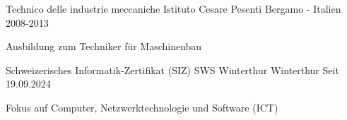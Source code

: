 

\begin{cventries}

   \cventry
    {Technico delle industrie meccaniche}
    {Istituto Cesare Pesenti}
    {Bergamo - Italien}
    {2008-2013}
    {
      \begin{cvitems} %
        \item {Ausbildung zum Techniker für Maschinenbau}
      \end{cvitems}
    }
    
   \cventry
    {Schweizerisches Informatik-Zertifikat (SIZ)}
    {SWS Winterthur}
    {Winterthur}
    {Seit 19.09.2024}
    {
      \begin{cvitems} %
	\item{Fokus auf Computer, Netzwerktechnologie und Software (ICT)}
      \end{cvitems}
    }


\end{cventries}
